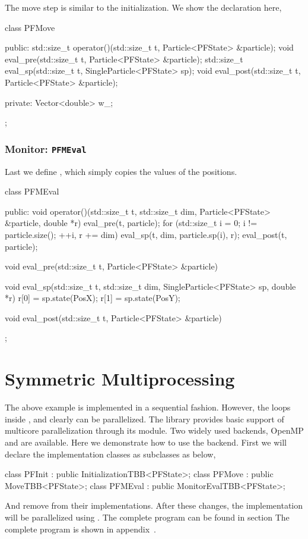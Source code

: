 The move step is similar to the initialization. We show the declaration here,
\begin{cppcode}
  class PFMove
  {
      public:
      std::size_t operator()(std::size_t t, Particle<PFState> &particle);
      void eval_pre(std::size_t t, Particle<PFState> &particle);
      std::size_t eval_sp(std::size_t t, SingleParticle<PFState> sp);
      void eval_post(std::size_t t, Particle<PFState> &particle);

      private:
      Vector<double> w_;
  };
\end{cppcode}

\subsubsection{Monitor: \texttt{PFMEval}}

Last we define , which simply copies the values of the
positions.
\begin{cppcode}
  class PFMEval
  {
      public:
      void operator()(std::size_t t, std::size_t dim,
          Particle<PFState> &particle, double *r)
      {
          eval_pre(t, particle);
          for (std::size_t i = 0; i != particle.size(); ++i, r += dim)
              eval_sp(t, dim, particle.sp(i), r);
          eval_post(t, particle);
      }

      void eval_pre(std::size_t t, Particle<PFState> &particle) {}

      void eval_sp(std::size_t t, std::size_t dim,
          SingleParticle<PFState> sp, double *r)
      {
          r[0] = sp.state(PosX);
          r[1] = sp.state(PosY);
      }

      void eval_post(std::size_t t, Particle<PFState> &particle) {}
  };
\end{cppcode}

\section{Symmetric Multiprocessing}
\label{sec:Symmetric Multiprocessing}

The above example is implemented in a sequential fashion. However, the loops
inside ,  and  clearly
can be parallelized. The library provides basic support of multicore
parallelization through its \smp module. Two widely used backends, OpenMP and
\tbb are available. Here we demonstrate how to use the \tbb backend. First we
will declare the implementation classes as subclasses as below,
\begin{cppcode}
  class PFInit : public InitializationTBB<PFState>;
  class PFMove : public MoveTBB<PFState>;
  class PFMEval : public MonitorEvalTBB<PFState>;
\end{cppcode}
And remove  from their implementations. After these
changes, the implementation will be parallelized using \tbb. The complete
program can be found in section The complete program is shown in
appendix~.

